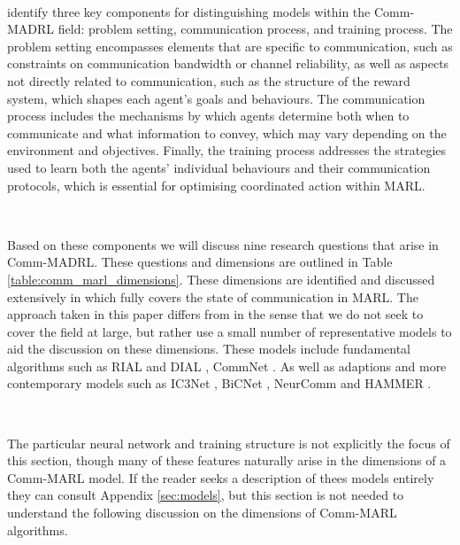 \documentclass{article}
\begin{document}
\

\citet{zhu2024survey} identify three key components for distinguishing models within the Comm-MADRL field: problem setting, communication process, and training process. The problem setting encompasses elements that are specific to communication, such as constraints on communication bandwidth or channel reliability, as well as aspects not directly related to communication, such as the structure of the reward system, which shapes each agent's goals and behaviours. The communication process includes the mechanisms by which agents determine both when to communicate and what information to convey, which may vary depending on the environment and objectives. Finally, the training process addresses the strategies used to learn both the agents' individual behaviours and their communication protocols, which is essential for optimising coordinated action within MARL.

\

Based on these components we will discuss nine research questions that arise in Comm-MADRL. These questions and dimensions are outlined in Table \ref{table:comm_marl_dimensions}. These dimensions are identified and discussed extensively in \citet{zhu2024survey} which fully covers the state of communication in MARL. The approach taken in this paper differs from \citet{zhu2024survey} in the sense that we do not seek to cover the field at large, but rather use a small number of representative models to aid the discussion on these dimensions. These models include fundamental algorithms such as RIAL and DIAL \citep{foerster2016learning}, CommNet \citep{sukhbaatar2016commnet}. As well as adaptions and more contemporary models such as IC3Net \citep{singh2018ic3net}, BiCNet \citep{peng2017bicnet}, NeurComm \citep{chu2020NeurComm} and HAMMER \citep{gupta2022HAMMER}. 

\

The particular neural network and training structure is not explicitly the focus of this section, though many of these features naturally arise in the dimensions of a Comm-MARL model. If the reader seeks a description of thees models entirely they can consult Appendix \ref{sec:models}, but this section is not needed to understand the following discussion on the dimensions of Comm-MARL algorithms.
\end{document}
